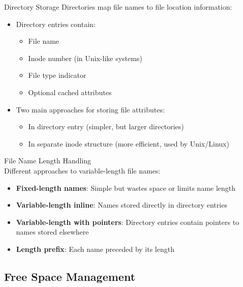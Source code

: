 \begin{definition}{Directory Storage}
    Directories map file names to file location information:
    \begin{itemize}
        \item Directory entries contain:
            \begin{itemize}
                \item File name
                \item Inode number (in Unix-like systems)
                \item File type indicator
                \item Optional cached attributes
            \end{itemize}
        \item Two main approaches for storing file attributes:
            \begin{itemize}
                \item In directory entry (simpler, but larger directories)
                \item In separate inode structure (more efficient, used by Unix/Linux)
            \end{itemize}
    \end{itemize}
\end{definition}

\begin{concept}{File Name Length Handling}\\
    Different approaches to variable-length file names:
    \begin{itemize}
        \item \textbf{Fixed-length names}: Simple but wastes space or limits name length
        \item \textbf{Variable-length inline}: Names stored directly in directory entries
        \item \textbf{Variable-length with pointers}: Directory entries contain pointers to names stored elsewhere
        \item \textbf{Length prefix}: Each name preceded by its length
    \end{itemize}
\end{concept}

\subsection{Free Space Management}

